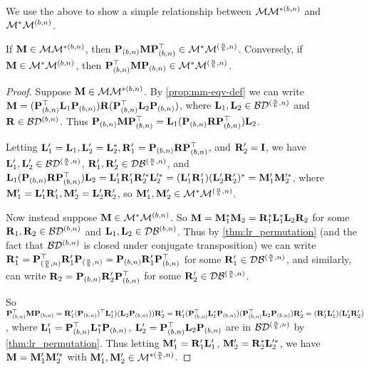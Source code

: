 We use the above to show a simple relationship between $\M\M^{*(b,n)}$ and $\M^*\M^{(b,n)}$.
\begin{proposition}
\label{prop:mstarm}
If $\vM \in \M\M^{*(b,n)}$, then $\vP_{(b,n)} \vM \vP_{(b,n)}^\top \in \M^*\M\ind{\frac{n}{b},n}$. Conversely, if $\vM \in \M^*\M^{(b,n)}$, then $\vP_{(b,n)}^\top \vM \vP_{(b,n)} \in \M^*\M\ind{\frac{n}{b},n}$.
\end{proposition}
\begin{proof}
Suppose $\vM \in \M\M^{*(b,n)}$. By \cref{prop:mm-eqv-def} we can write $\vM = (\vP_{(b,n)}^\top \vL_1 \vP_{(b,n)}) \vR (\vP_{(b,n)}^\top\vL_2\vP_{(b,n)})$, where $\vL_1,\vL_2 \in \BD\ind{\frac{n}{b},n}$ and $\vR \in \BD\ind{b,n}$.
Thus $\vP_{(b,n)} \vM \vP_{(b,n)}^\top =
\vL_1 (\vP_{(b,n)} \vR \vP_{(b,n)}^\top) \vL_2$.

Letting $\vL_1' = \vL_1, \vL_2' = \vL_2^*, \vR_1' = \vP_{(b,n)} \vR \vP_{(b,n)}^\top$, and $\vR_2' = \vI$, we have $\vL_1', \vL_2' \in \BD\ind{\frac{n}{b}, n}$, $\vR_1', \vR_2' \in \DB\ind{\frac{n}{b}, n}$, and
$\vL_1 (\vP_{(b,n)} \vR \vP_{(b,n)}^\top) \vL_2 = 
\vL_1' \vR_1' \vR_2'^* \vL_2'^* = (\vL_1' \vR_1')(\vL_2' \vR_2')^* = \vM_1'\vM_2'^*$, where $\vM_1' = \vL_1' \vR_1', \vM_2' = \vL_2' \vR_2'$, so $\vM_1', \vM_2' \in \M^*\M\ind{\frac{n}{b},n}$.

Now instead suppose $\vM \in \M^*\M^{(b,n)}$. So $\vM = \vM_1^* \vM_2 = \vR_1^* \vL_1^* \vL_2 \vR_2$ for some $\vR_1, \vR_2 \in \BD\ind{b,n}$ and $\vL_1, \vL_2 \in \DB\ind{b,n}$. Thus by \cref{thm:lr_permutation} (and the fact that $\BD\ind{b,n}$ is closed under conjugate transposition) we can write $\vR_1^* = \vP_{(\frac{n}{b},n)}^\top \vR_1' \vP_{(\frac{n}{b}, n)} = \vP_{(b,n)} \vR_1' \vP_{(b, n)}^\top$ for some $\vR_1' \in \DB\ind{\frac{n}{b}, n}$, and similarly, can write $\vR_2 = \vP_{(b,n)} \vR_2' \vP_{(b,n)}^\top$ for some $\vR_2' \in \DB\ind{\frac{n}{b}, n}$. 

So $\vP_{(b,n)}^\top \vM \vP_{(b,n)} = \vR_1' (\vP_{(b, n)})^\top \vL_1^*)(\vL_2 \vP_{(b, n)})) \vR_2' =
 \vR_1' (\vP_{(b, n)}^\top \vL_1^* \vP_{(b, n)})(\vP_{(b, n)}^\top \vL_2 \vP_{(b, n)}) \vR_2' = (\vR_1' \vL_1')(\vL_2' \vR_2')$, where $\vL_1' = \vP_{(b, n)}^\top \vL_1^* \vP_{(b, n)}$, $\vL_2' = \vP_{(b, n)}^\top \vL_2 \vP_{(b, n)}$ are in $\BD\ind{\frac{n}{b}, n}$ by \cref{thm:lr_permutation}. Thus letting $\vM_1' = \vR_1'\vL_1'$, $\vM_2' = \vR_2^*\vL_2'^*$, we have $\vM = \vM_1' \vM_2'^*$ with $\vM_1', \vM_2' \in \M^{*(\frac{n}{b},n)}$.
\end{proof}

